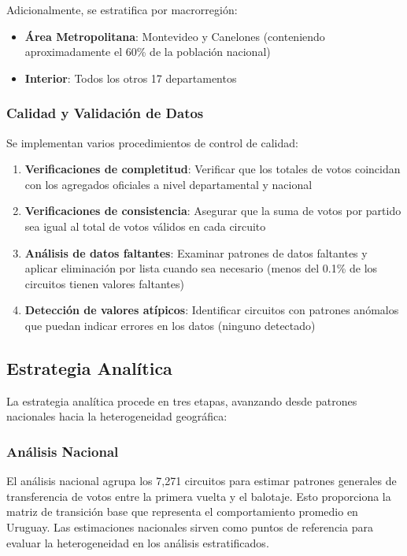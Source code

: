 Adicionalmente, se estratifica por macrorregión:
\begin{itemize}
    \item \textbf{Área Metropolitana}: Montevideo y Canelones (conteniendo aproximadamente el 60\% de la población nacional)
    \item \textbf{Interior}: Todos los otros 17 departamentos
\end{itemize}

\subsubsection{Calidad y Validación de Datos}

Se implementan varios procedimientos de control de calidad:

\begin{enumerate}
    \item \textbf{Verificaciones de completitud}: Verificar que los totales de votos coincidan con los agregados oficiales a nivel departamental y nacional
    \item \textbf{Verificaciones de consistencia}: Asegurar que la suma de votos por partido sea igual al total de votos válidos en cada circuito
    \item \textbf{Análisis de datos faltantes}: Examinar patrones de datos faltantes y aplicar eliminación por lista cuando sea necesario (menos del 0.1\% de los circuitos tienen valores faltantes)
    \item \textbf{Detección de valores atípicos}: Identificar circuitos con patrones anómalos que puedan indicar errores en los datos (ninguno detectado)
\end{enumerate}

\subsection{Estrategia Analítica}

La estrategia analítica procede en tres etapas, avanzando desde patrones nacionales hacia la heterogeneidad geográfica:

\subsubsection{Análisis Nacional}

El análisis nacional agrupa los 7,271 circuitos para estimar patrones generales de transferencia de votos entre la primera vuelta y el balotaje. Esto proporciona la matriz de transición base que representa el comportamiento promedio en Uruguay. Las estimaciones nacionales sirven como puntos de referencia para evaluar la heterogeneidad en los análisis estratificados.

